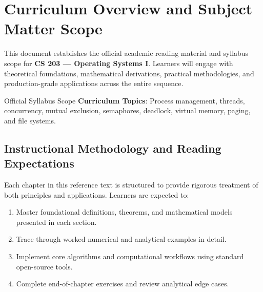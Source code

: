 \section{Curriculum Overview and Subject Matter Scope}

This document establishes the official academic reading material and syllabus scope for \textbf{CS 203 --- Operating Systems I}. Learners will engage with theoretical foundations, mathematical derivations, practical methodologies, and production-grade applications across the entire sequence.

\begin{InsightBox}{Official Syllabus Scope}
  \textbf{Curriculum Topics}: Process management, threads, concurrency, mutual exclusion, semaphores, deadlock, virtual memory, paging, and file systems.
\end{InsightBox}

\subsection{Instructional Methodology and Reading Expectations}

Each chapter in this reference text is structured to provide rigorous treatment of both principles and applications. Learners are expected to:
\begin{enumerate}
  \item Master foundational definitions, theorems, and mathematical models presented in each section.
  \item Trace through worked numerical and analytical examples in detail.
  \item Implement core algorithms and computational workflows using standard open-source tools.
  \item Complete end-of-chapter exercises and review analytical edge cases.
\end{enumerate}


